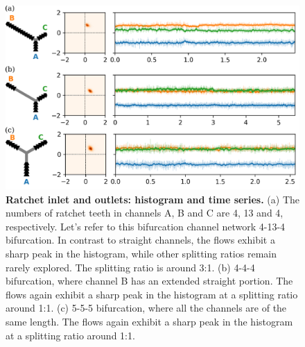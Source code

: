 \documentclass[%
10pt,
superscriptaddress,
twocolumn,
 amsmath,amssymb,
 aps,prx,
]{revtex4-2}
\begin{document}
\begin{figure}[!h]
    \includegraphics[width=\textwidth]{5-ratchet-dominance}
    \caption{
    \textbf{Ratchet inlet and outlets: histogram and time series.}
    (a) The numbers of ratchet teeth in channels A, B and C are 4, 13 and 4, respectively. 
    Let's refer to this bifurcation channel network 4-13-4 bifurcation. 
    In contrast to straight channels, the flows exhibit a sharp peak in the histogram, while other splitting ratios remain rarely explored. 
    The splitting ratio is around 3:1.
    (b) 4-4-4 bifurcation, where channel B has an extended straight portion. 
    The flows again exhibit a sharp peak in the histogram at a splitting ratio around 1:1.
    (c) 5-5-5 bifurcation, where all the channels are of the same length. 
    The flows again exhibit a sharp peak in the histogram at a splitting ratio around 1:1.
    }
    \label{fig:ratchet-dominance}
\end{figure}
\end{document}
